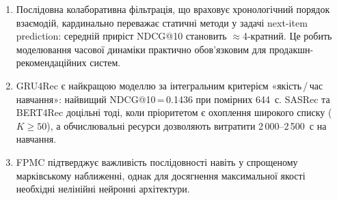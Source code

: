 \documentclass[12pt,a4paper]{article}
\begin{document}
\begin{enumerate}
    \item Послідовна колаборативна фільтрація, що враховує хронологічний
          порядок взаємодій, кардинально переважає статичні методи у
          задачі next-item prediction: середній приріст NDCG@10 становить
          $\approx$4-кратний. Це робить моделювання часової динаміки
          практично обов'язковим для продакшн-рекомендаційних систем.

    \item GRU4Rec є найкращою моделлю за інтегральним критерієм
          «якість\,/\,час навчання»: найвищий NDCG@10\,=\,0.1436 при
          помірних 644~с.
          SASRec та BERT4Rec доцільні тоді, коли пріоритетом є охоплення
          широкого списку ($K\ge 50$), а обчислювальні ресурси дозволяють
          витратити 2\,000--2\,500~с на навчання.

    \item FPMC підтверджує важливість послідовності навіть у спрощеному
          марківському наближенні, однак для досягнення максимальної
          якості необхідні нелінійні нейронні архітектури.
\end{enumerate}
\end{document}
